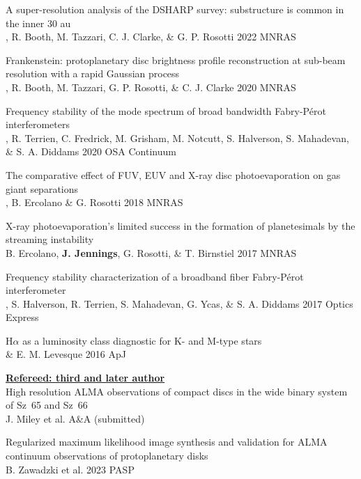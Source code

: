 \documentclass[10pt,preprint]{aastex}
\begin{document}
\noindent A super-resolution analysis of the DSHARP survey: substructure is common in the inner 30 au \\
, R. Booth, M. Tazzari, C. J. Clarke, \& G. P. Rosotti 2022 MNRAS

\noindent Frankenstein: protoplanetary disc brightness profile reconstruction at sub-beam resolution with a rapid Gaussian process \\
, R. Booth, M. Tazzari, G. P. Rosotti, \& C. J. Clarke 2020 MNRAS

\noindent Frequency stability of the mode spectrum of broad bandwidth Fabry-P{\'e}rot interferometers \\
, R. Terrien, C. Fredrick, M. Grisham, M. Notcutt, S. Halverson, S. Mahadevan, \\ 
\indent \& S. A. Diddams 2020 OSA Continuum 

\noindent The comparative effect of FUV, EUV and X-ray disc photoevaporation on gas giant separations \\
, B. Ercolano \& G. Rosotti 2018 MNRAS 

\noindent X-ray photoevaporation's limited success in the formation of planetesimals by the streaming instability\\
\indent B. Ercolano, {\bf J. Jennings}, G. Rosotti, \& T. Birnstiel 2017 MNRAS

\newpage %

\noindent Frequency stability characterization of a broadband fiber Fabry-P{\'e}rot interferometer \\
, S. Halverson, R. Terrien, S. Mahadevan, G. Ycas, \& S. A. Diddams 2017 Optics Express

\noindent H$\alpha$ as a luminosity class diagnostic for K- and M-type stars \\
 \& E. M. Levesque 2016 ApJ 

\noindent \underline{{\bf Refereed: third and later author}} \\
\noindent High resolution ALMA observations of compact discs in the wide binary system of Sz~65 and Sz~66\\
\indent J. Miley et al. A\&A (submitted)

\noindent Regularized maximum likelihood image synthesis and validation for ALMA continuum
observations of protoplanetary disks \\
\indent B. Zawadzki et al. 2023 PASP
\end{document}

